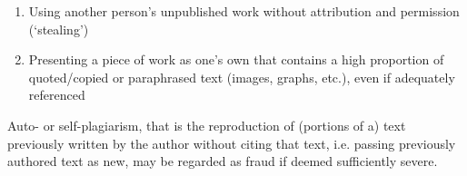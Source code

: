 \documentclass[conference,compsoc]{IEEEtran}
\begin{document}
\begin{itemize}
\begin{enumerate}
		\item Using another person’s unpublished work without attribution and permission (‘stealing’)
		\item Presenting a piece of work as one’s own that contains a high proportion of quoted/copied or paraphrased text (images, graphs, etc.), even if adequately referenced
	\end{enumerate}
	Auto- or self-plagiarism, that is the reproduction of (portions of a) text previously written by the author without citing that text, i.e. passing previously authored text as new, may be regarded as fraud if deemed sufficiently severe.
\end{itemize}

%
%



%
%
\end{document}
